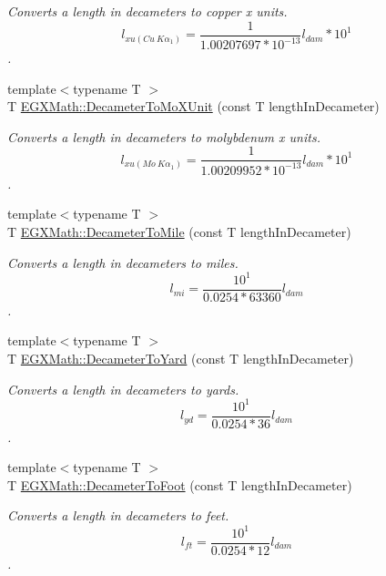 \begin{DoxyCompactItemize}
\begin{DoxyCompactList}\small\item\em Converts a length in decameters to copper x units. \[ l_{xu(Cu\ K\alpha_1)}= \frac{1}{1.00207697*10^{-13}} l_{dam} * 10^{1}\]. \end{DoxyCompactList}\item 
{\footnotesize template$<$typename T $>$ }\\T \mbox{\hyperlink{group___e_g_x_math-_conversions-_length_conversions-_s_i-_decameter-_non-_s_i_ga9e345feeb2568ded9fdceaf1d23d0ca6}{E\+G\+X\+Math\+::\+Decameter\+To\+Mo\+X\+Unit}} (const T length\+In\+Decameter)
\begin{DoxyCompactList}\small\item\em Converts a length in decameters to molybdenum x units. \[ l_{xu(Mo\ K\alpha_1)}=\frac{1}{1.00209952*10^{-13}} l_{dam} * 10^{1}\]. \end{DoxyCompactList}\item 
{\footnotesize template$<$typename T $>$ }\\T \mbox{\hyperlink{group___e_g_x_math-_conversions-_length_conversions-_s_i-_decameter-_imperial_gac2a54223d869e01fc7a9c73fbf3f2906}{E\+G\+X\+Math\+::\+Decameter\+To\+Mile}} (const T length\+In\+Decameter)
\begin{DoxyCompactList}\small\item\em Converts a length in decameters to miles. \[ l_{mi}=\frac{10^{1}}{0.0254 * 63360} l_{dam} \]. \end{DoxyCompactList}\item 
{\footnotesize template$<$typename T $>$ }\\T \mbox{\hyperlink{group___e_g_x_math-_conversions-_length_conversions-_s_i-_decameter-_imperial_ga42a81b14a91ba9ddb4967faa55b6a3a0}{E\+G\+X\+Math\+::\+Decameter\+To\+Yard}} (const T length\+In\+Decameter)
\begin{DoxyCompactList}\small\item\em Converts a length in decameters to yards. \[ l_{yd}= \frac{10^{1}}{0.0254 * 36} l_{dam} \]. \end{DoxyCompactList}\item 
{\footnotesize template$<$typename T $>$ }\\T \mbox{\hyperlink{group___e_g_x_math-_conversions-_length_conversions-_s_i-_decameter-_imperial_gad2829e03e1755db4f7f9b21070ecaef6}{E\+G\+X\+Math\+::\+Decameter\+To\+Foot}} (const T length\+In\+Decameter)
\begin{DoxyCompactList}\small\item\em Converts a length in decameters to feet. \[ l_{ft}= \frac{10^{1}}{0.0254 * 12} l_{dam} \]. \end{DoxyCompactList}\item 

\end{DoxyCompactItemize}

